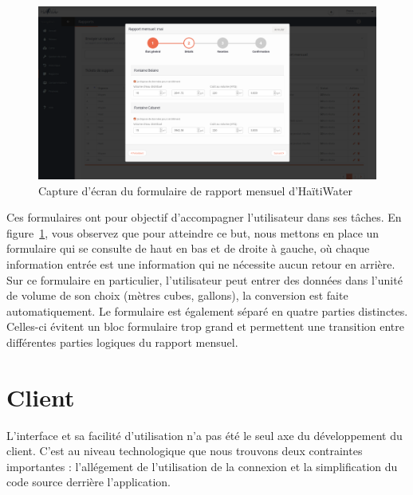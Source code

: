 \documentclass{EPL-master-thesis-covers-FR}
\begin{document}
			\begin{figure}[H]
				\includegraphics[width=\textwidth]{images/screen_rapport_mensuel.png}
				\caption{Capture d'écran du formulaire de rapport mensuel d'HaïtiWater}
				\label{fig:screen_rapport_mensuel}
			\end{figure}

			Ces formulaires ont pour objectif d'accompagner l'utilisateur dans ses tâches. En figure~\ref{fig:screen_rapport_mensuel}, vous observez que pour atteindre ce but, nous mettons en place un formulaire qui se consulte de haut en bas et de droite à gauche, où chaque information entrée est une information qui ne nécessite aucun retour en arrière. Sur ce formulaire en particulier, l'utilisateur peut entrer des données dans l'unité de volume de son choix (mètres cubes, gallons), la conversion est faite automatiquement. Le formulaire est également séparé en quatre parties distinctes. Celles-ci évitent un bloc formulaire trop grand et permettent une transition entre différentes parties logiques du rapport mensuel.





		\section{Client}

			L'interface et sa facilité d'utilisation n'a pas été le seul axe du développement du client. C'est au niveau technologique que nous trouvons deux contraintes importantes : l'allégement de l'utilisation de la connexion et la simplification du code source derrière l'application.
\end{document}
